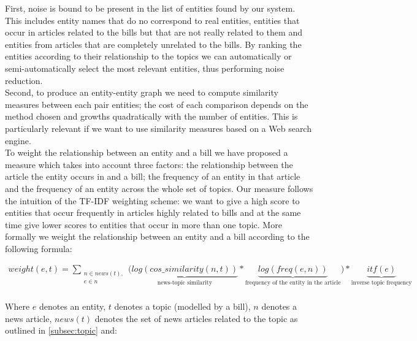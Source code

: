 First, noise is bound to be present in the list of entities found by our system. This includes entity names that do no correspond to real entities, entities that occur in articles related to the bills but that are not really related to them and entities from articles that are completely unrelated to the bills. By ranking the entities according to their relationship to the topics we can automatically or semi-automatically select the most relevant entities, thus performing noise reduction. \\

Second, to produce an entity-entity graph we need to compute similarity measures between each pair entities; the cost of each comparison depends on the method chosen and growths quadratically with the number of entities. This is particularly relevant if we want to use similarity measures based on a Web search engine. \\

To weight the relationship between an entity and a bill we have proposed a measure which takes into account three factors: the relationship between the article the entity occurs in and a bill; the frequency of an entity in that article and the frequency of an entity across the whole set of topics. Our measure follows the intuition of the TF-IDF weighting scheme: we want to give a high score to entities that occur frequently in articles highly related to bills and at the same time give lower scores to entities that occur in more than one topic. More formally we weight the relationship between an entity and a bill according to the following formula:


\begin{eqnarray*}
weight(e,t) = \sum_{\substack{n \in news(t), \\e \in n}}{\Big(\underbrace{log(cos\_similarity(n,t))}_{\text{news-topic similarity}}*\underbrace{log(freq(e,n))}_{\text{frequency of the entity in the article}}} \Big) * \underbrace{itf(e)}_{\text{inverse topic frequency}}\\
\end{eqnarray*}

Where $e$ denotes an entity, $t$ denotes a topic (modelled by a bill), $n$ denotes a news article, $news(t)$ denotes the set of news articles related to the topic as outlined in \ref{subsec:topic} and:

